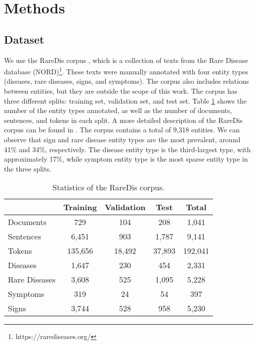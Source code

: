 \documentclass[preprint,12pt]{elsarticle}
\begin{document}
\section{Methods}
\label{sec:approach}

\subsection{Dataset}
We use the RareDis corpus \cite{martinez2021RareDis}, which is a collection of texts from the Rare Disease database (NORD)\footnote{https://rarediseases.org/}. These texts were manually annotated with four entity types (diseases, rare diseases, signs, and symptoms). The corpus also includes relations between entities, but they are outside the scope of this work. 
The corpus has three different splits: training set, validation set, and test set.  
Table \ref{tab:raredis} shows the number of the entity types annotated, as well as the number of documents, sentences, and tokens in each split. 
A more detailed description of the RareDis corpus can be found in  \cite{martinez2021RareDis}. The corpus contains a total of 9,318 entities. We can observe that sign and rare disease entity types are the most prevalent, around 41\% and 34\%, respectively. The disease entity type is the third-largest type, with approximately 17\%, while symptom entity type is the most sparse entity type in the three splits. 


\begin{table}[!htbp]
\centering
\caption{Statistics of the RareDis corpus.}
      \begin{tabular}{lcccc}
        \hline
           & Training  &Validation   & Test & Total\\ \hline
           
        Documents & 729 & 104 & 208 & 1,041\\
        

        Sentences & 6,451 & 903  & 1,787 & 9,141\\
        Tokens & 135,656  & 18,492   & 37,893 & 192,041\\\hline 
        Diseases & 1,647 & 230 & 454 & 2,331\\
        Rare Diseases & 3,608 & 525  & 1,095 & 5,228\\
        Symptoms & 319  & 24   & 54 & 397\\ 
        Signs & 3,744  & 528   & 958 & 5,230\\ 
        \hline 
        
      \end{tabular}
      \label{tab:raredis}
\end{table}
\end{document}
